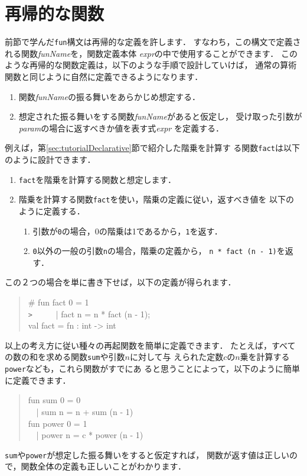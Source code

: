 \documentclass{jbook}
\newif\ifjp
\newcommand{\txt}[2]{#1}
\begin{document}
\fi%


\section{\txt{再帰的な関数}{Recursive functions}}
\label{sec:tutorialRecursion}

\ifjp%
	前節で学んだ{\tt fun}構文は再帰的な定義を許します．
	すなわち，この構文で定義される関数{\it funName}を，関数定義本体
{\it expr}の中で使用することができます．
	このような再帰的な関数定義は，以下のような手順で設計していけば，
通常の算術関数と同じように自然に定義できるようになります．
\begin{enumerate}
\item 関数{\it funName}の振る舞いをあらかじめ想定する．
\item 想定された振る舞いをする関数{\it funName}があると仮定し，
受け取った引数が{\it param}の場合に返すべきか値を表す式{\it expr}
を定義する．
\end{enumerate}
	例えば，第\ref{sec:tutorialDeclarative}節で紹介した階乗を計算す
る関数{\tt fact}は以下のように設計できます．
\begin{enumerate}
\item {\tt fact}を階乗を計算する関数と想定します．
\item 階乗を計算する関数{\tt fact}を使い，階乗の定義に従い，返すべき値を
以下のように定義する．
\begin{enumerate}
\item 引数が{\tt 0}の場合，0の階乗は1であるから，{\tt 1}を返す．
\item {\tt 0}以外の一般の引数{\tt n}の場合，階乗の定義から，
{\tt n * fact (n - 1)}を返す．
\end{enumerate}
\end{enumerate}
	この２つの場合を単に書き下せば，以下の定義が得られます．
\begin{tt}
\begin{quote}
\# fun fact 0 = 1\\
\verb|>| \ \ \ \ \ | fact n = n * fact (n - 1);\\
val fact = fn : int -> int
\end{quote}
\end{tt}

	以上の考え方に従い種々の再起関数を簡単に定義できます．
	たとえば，すべての数の和を求める関数{\tt sum}や引数$n$に対して与
えられた定数$c$の$n$乗を計算する{\tt power}なども，これら関数がすでにあ
ると思うことによって，以下のように簡単に定義できます．
\begin{tt}
\begin{quote}
fun sum 0 = 0\\
\ \ | sum n = n + sum (n - 1)\\
fun power 0 = 1\\
\ \ | power n = c * power (n - 1)
\end{quote}
\end{tt}
	{\tt sum}や{\tt power}が想定した振る舞いをすると仮定すれば，
関数が返す値は正しいので，関数全体の定義も正しいことがわかります．
\end{document}
